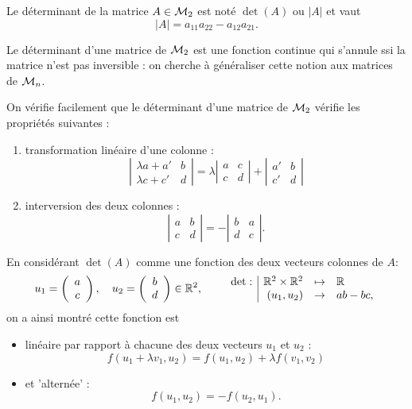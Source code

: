 \begin{definition} \label{def:determinantMatrice22}
  Le déterminant de la matrice $A \in \mathcal{M}_2$ est noté $\det(A)$ ou $|A|$ et vaut
  $$
  |A| = a_{11} a_{22} - a_{12} a_{21}.
  $$
\end{definition}

\bigskip
Le déterminant d'une matrice de $\mathcal{M}_2$ est une fonction continue qui s'annule ssi la matrice n'est pas inversible : on cherche à généraliser cette notion aux matrices de $\mathcal{M}_n$.

\remark
On vérifie facilement que le déterminant d'une matrice de $\mathcal{M}_2$ vérifie les propriétés suivantes : 
\begin{enumerate}
  \item transformation linéaire d'une colonne :
  $$
  \left| \begin{array}{cc} \lambda a + a' & b \\ \lambda c + c' & d \end{array} \right|
  =
  \lambda \left| \begin{array}{cc} a & c \\ c & d \end{array} \right|
  +
  \left| \begin{array}{cc} a' & b \\ c ' & d \end{array} \right|
  $$
  \item interversion des deux colonnes :
  $$
  \left| \begin{array}{cc} a & b \\ c & d \end{array} \right|
  =
  - \left| \begin{array}{cc} b & a \\ d & c \end{array} \right|.
  $$
\end{enumerate}
En considérant $\det(A)$ comme une fonction des deux vecteurs colonnes de $A$:
$$
u_1 = \left(\begin{array}{c}a \\c \end{array} \right), \quad
u_2 = \left(\begin{array}{c}b \\d \end{array} \right) \in \mathbb{R}^2, \qquad
\begin{array}{r|rcl}
  \det : & \mathbb{R}^2 \times \mathbb{R}^2 & \mapsto & \mathbb{R} \\
  & (u_1, u_2) & \rightarrow & ab - bc,
\end{array}
$$
on a ainsi montré cette fonction est 
\begin{itemize}
 \item linéaire par rapport à chacune des deux vecteurs $u_1$ et $u_2$ :
 $$
 f(u_1 + \lambda v_1, u_2) = f(u_1, u_2) + \lambda f(v_1, v_2)
 $$
 \item et 'alternée' :
 $$
 f(u_1, u_2) = -f(u_2, u_1).
 $$
\end{itemize}

